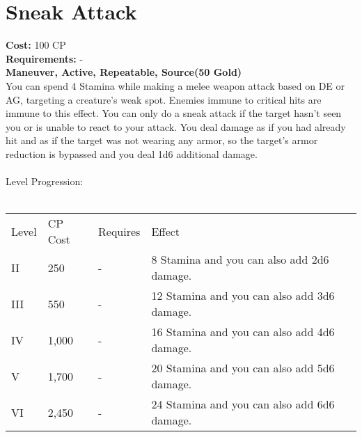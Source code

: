 \section{Sneak Attack}
\textbf{Cost:} 100 CP\\
\textbf{Requirements:} -\\
\textbf{Maneuver, Active, Repeatable, Source(50 Gold)}\\
You can spend 4 Stamina while making a melee weapon attack based on DE or AG, targeting a creature’s weak spot. Enemies immune to critical hits are immune to this effect. You can only do a sneak attack if the target hasn't seen you or is unable to react to your attack. You deal damage as if you had already hit and as if the target was not wearing any armor, so the target's armor reduction is bypassed and you deal 1d6 additional damage.\\
\\
Level Progression:\\
\\
\begin{tabular}{l | l | l | l}
	Level & CP Cost & Requires & Effect\\
	II & 250 & - & 8 Stamina and you can also add 2d6 damage.\\
	III & 550 & - &  12 Stamina and you can also add 3d6 damage.\\
	IV & 1,000 & - &  16 Stamina and you can also add 4d6 damage.\\
	V & 1,700 & - &  20 Stamina and you can also add 5d6 damage.\\
	VI & 2,450 & - &  24 Stamina and you can also add 6d6 damage.\\
\end{tabular}